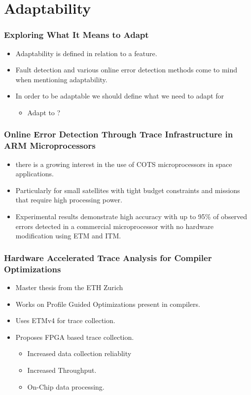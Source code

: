 \documentclass{beamer}
\begin{document}
\section{Adaptability}
\begin{frame}
    \frametitle{Exploring What It Means to Adapt}
    \begin{itemize}
        \item Adaptability is defined in relation to a feature.
        \item Fault detection and various online error detection methods come
            to mind when mentioning adaptability.
        \item In order to be adaptable we should define what we need to adapt
            for
            \begin{itemize}
                \item Adapt to ?
            \end{itemize}
    \end{itemize}
\end{frame}
\begin{frame}
    \frametitle{Online Error Detection Through Trace Infrastructure in
    ARM Microprocessors}
    \begin{itemize}
        \item there is a growing interest in the use of COTS microprocessors
            in space applications.
        \item Particularly for small satellites with tight budget constraints
            and missions that require high processing power.
        \item Experimental results demonstrate high accuracy with up to 95\% 
            of observed errors detected in a commercial microprocessor with
            no hardware modification using ETM and ITM.
    \end{itemize}
\end{frame}
\begin{frame}
    \frametitle{Hardware Accelerated Trace Analysis for Compiler Optimizations}
    \begin{itemize}
        \item Master thesis from the ETH Zurich
        \item Works on Profile Guided Optimizations present in compilers.
        \item Uses ETMv4 for trace collection.
        \item Proposes FPGA based trace collection.
            \begin{itemize}
                \item Increased data collection reliablity
                \item Increased Throughput.
                \item On-Chip data processing.
            \end{itemize}
    \end{itemize}
\end{frame}
\end{document}
